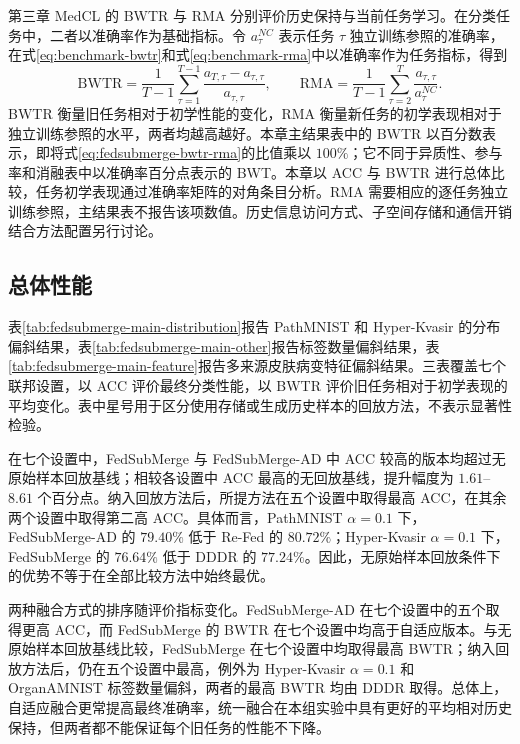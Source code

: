 第三章 MedCL 的 BWTR 与 RMA 分别评价历史保持与当前任务学习。在分类任务中，二者以准确率作为基础指标。令 $a_{\tau}^{NC}$ 表示任务 $\tau$ 独立训练参照的准确率，在式\eqref{eq:benchmark-bwtr}和式\eqref{eq:benchmark-rma}中以准确率作为任务指标，得到
\begin{equation}
\mathrm{BWTR}
=
\frac{1}{T-1}\sum_{\tau=1}^{T-1}
\frac{a_{T,\tau}-a_{\tau,\tau}}{a_{\tau,\tau}},
\qquad
\mathrm{RMA}
=
\frac{1}{T-1}\sum_{\tau=2}^{T}
\frac{a_{\tau,\tau}}{a_{\tau}^{NC}}.
\label{eq:fedsubmerge-bwtr-rma}
\end{equation}
BWTR 衡量旧任务相对于初学性能的变化，RMA 衡量新任务的初学表现相对于独立训练参照的水平，两者均越高越好。本章主结果表中的 BWTR 以百分数表示，即将式\eqref{eq:fedsubmerge-bwtr-rma}的比值乘以 $100\%$；它不同于异质性、参与率和消融表中以准确率百分点表示的 BWT。本章以 ACC 与 BWTR 进行总体比较，任务初学表现通过准确率矩阵的对角条目分析。RMA 需要相应的逐任务独立训练参照，主结果表不报告该项数值。历史信息访问方式、子空间存储和通信开销结合方法配置另行讨论。

\subsection{总体性能}
\label{subsec:fedsubmerge-main-results}

表\ref{tab:fedsubmerge-main-distribution}报告 PathMNIST 和 Hyper-Kvasir 的分布偏斜结果，表\ref{tab:fedsubmerge-main-other}报告标签数量偏斜结果，表\ref{tab:fedsubmerge-main-feature}报告多来源皮肤病变特征偏斜结果。三表覆盖七个联邦设置，以 ACC 评价最终分类性能，以 BWTR 评价旧任务相对于初学表现的平均变化。表中星号用于区分使用存储或生成历史样本的回放方法，不表示显著性检验。



在七个设置中，FedSubMerge 与 FedSubMerge-AD 中 ACC 较高的版本均超过无原始样本回放基线；相较各设置中 ACC 最高的无回放基线，提升幅度为 $1.61$--$8.61$ 个百分点。纳入回放方法后，所提方法在五个设置中取得最高 ACC，在其余两个设置中取得第二高 ACC。具体而言，PathMNIST $\alpha=0.1$ 下，FedSubMerge-AD 的 $79.40\%$ 低于 Re-Fed 的 $80.72\%$；Hyper-Kvasir $\alpha=0.1$ 下，FedSubMerge 的 $76.64\%$ 低于 DDDR 的 $77.24\%$。因此，无原始样本回放条件下的优势不等于在全部比较方法中始终最优。

两种融合方式的排序随评价指标变化。FedSubMerge-AD 在七个设置中的五个取得更高 ACC，而 FedSubMerge 的 BWTR 在七个设置中均高于自适应版本。与无原始样本回放基线比较，FedSubMerge 在七个设置中均取得最高 BWTR；纳入回放方法后，仍在五个设置中最高，例外为 Hyper-Kvasir $\alpha=0.1$ 和 OrganAMNIST 标签数量偏斜，两者的最高 BWTR 均由 DDDR 取得。总体上，自适应融合更常提高最终准确率，统一融合在本组实验中具有更好的平均相对历史保持，但两者都不能保证每个旧任务的性能不下降。

